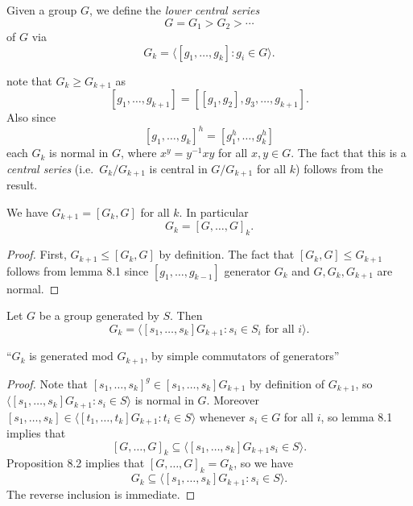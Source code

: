 \documentclass[a4paper]{article}
\begin{document}
\begin{definition}
  Given a group \(G\), we define the \emph{lower central series}
  \[
    G = G_1 > G_2 > \cdots
  \]
  of \(G\) via
  \[
    G_k = \langle [g_1, \dots, g_k]: g_i \in G \rangle.
  \]
\end{definition}

note that \(G_k \geq G_{k + 1}\) as
\[
  [g_1, \dots, g_{k + 1}] = [[g_1, g_2], g_3, \dots, g_{k + 1}].
\]
Also since
\[
  [g_1, \dots, g_k]^h = [g_1^h, \dots, g_k^h]
\]
each \(G_k\) is normal in \(G\), where \(x^y = y^{-1}xy\) for all \(x, y \in G\). The fact that this is a \emph{central series} (i.e.\ \(G_k/G_{k + 1}\) is central in \(G/G_{k + 1}\) for all \(k\)) follows from the result.

\begin{proposition}[prop 8.2]
  We have \(G_{k + 1} = [G_k, G]\) for all \(k\). In particular
  \[
    G_k = [G, \dots, G]_k.
  \]
\end{proposition}

\begin{proof}
  First, \(G_{k + 1} \leq [G_k, G]\) by definition. The fact that \([G_k, G] \leq G_{k + 1}\) follows from lemma 8.1 since \([g_1, \dots, g_{k - 1}]\) generator \(G_k\) and \(G, G_k, G_{k + 1}\) are normal.
\end{proof}

\begin{proposition}[prop 8.3]
  Let \(G\) be a group generated by \(S\). Then
  \[
    G_k = \langle [s_1, \dots, s_k] G_{k + 1}: s_i \in S_i \text{ for all } i \rangle.
  \]
\end{proposition}
``\(G_k\) is generated mod \(G_{k + 1}\), by simple commutators of generators''

\begin{proof}
  Note that \([s_1, \dots, s_k]^g \in [s_1, \dots, s_k] G_{k + 1}\) by definition of \(G_{k + 1}\), so \(\langle [s_1, \dots, s_k] G_{k + 1}: s_i \in S \rangle\) is normal in \(G\). Moreover \([s_1, \dots, s_k] \in \langle [t_1, \dots, t_k] G_{k + 1}: t_i \in S \rangle\) whenever \(s_i \in G\) for all \(i\), so lemma 8.1 implies that
  \[
    [G, \dots, G]_k \subseteq \langle [s_1, \dots, s_k] G_{k + 1} s_i \in S \rangle.
  \]
  Proposition 8.2 implies that \([G, \dots, G]_k = G_k\), so we have
  \[
    G_k \subseteq \langle [s_1, \dots, s_k] G_{k + 1}: s_i \in S \rangle.
  \]
  The reverse inclusion is immediate.
\end{proof}
\end{document}
